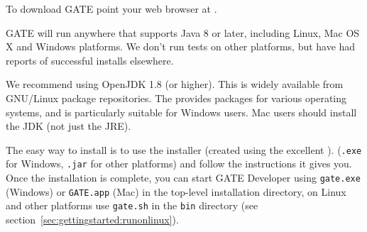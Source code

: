 



To download GATE point your web browser at
.


%
GATE will run anywhere that supports Java 8 or later, including Linux,
Mac OS X and Windows platforms. We don't run tests on other platforms, but have
had reports of successful installs elsewhere.

We recommend using OpenJDK 1.8 (or higher).  This is widely available from
GNU/Linux package repositories.  The
 provides packages for
various operating systems, and is particularly suitable for Windows users.  Mac
users should install the JDK (not just the JRE).
%

The easy way to install is to use the installer
(created using the excellent ).
 (\verb!.exe! for
Windows, \verb!.jar! for other platforms) and follow the instructions it gives
you. Once the installation is complete, you can start GATE Developer using
\verb|gate.exe| (Windows) or \verb|GATE.app| (Mac) in the top-level
installation directory, on Linux and other platforms use \verb|gate.sh| 
in the \texttt{bin} directory (see section~\ref{sec:gettingstarted:runonlinux}).




